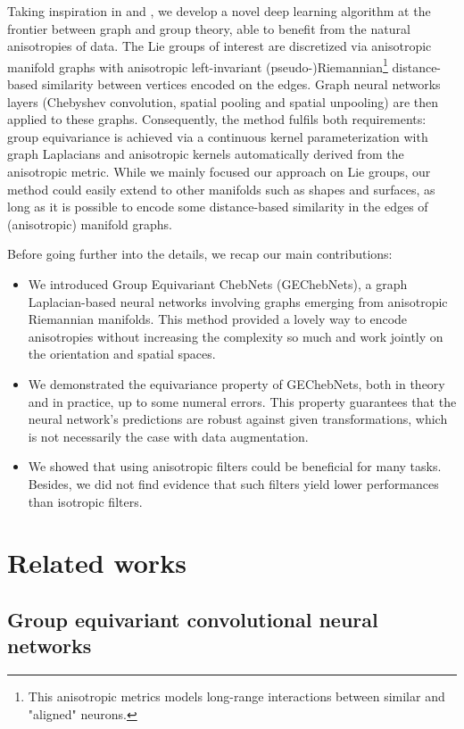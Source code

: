 \documentclass{article}
\begin{document}
Taking inspiration in \citet{defferrard2020deepsphere} and \citet{bekkers2019b}, we develop a novel deep learning algorithm at the frontier between graph and group theory, able to benefit from the natural anisotropies of data. The Lie groups of interest are discretized via anisotropic manifold graphs with anisotropic left-invariant (pseudo-)Riemannian\footnote{This anisotropic metrics models long-range interactions between similar and "aligned" neurons.} distance-based similarity between vertices encoded on the edges. Graph neural networks layers (Chebyshev convolution, spatial pooling and spatial unpooling) are then applied to these graphs. Consequently, the method fulfils both requirements: group equivariance is achieved via a continuous kernel parameterization with graph Laplacians and anisotropic kernels automatically derived from the anisotropic metric. While we mainly focused our approach on Lie groups, our method could easily extend to other manifolds such as shapes and surfaces, as long as it is possible to encode some distance-based similarity in the edges of (anisotropic) manifold graphs.

Before going further into the details, we recap our main contributions:
\begin{itemize}
\item We introduced Group Equivariant ChebNets (GEChebNets), a graph Laplacian-based neural networks involving graphs emerging from anisotropic Riemannian manifolds. This method provided a lovely way to encode anisotropies without increasing the complexity so much and work jointly on the orientation and spatial spaces.
\item We demonstrated the equivariance property of GEChebNets, both in theory and in practice, up to some numeral errors. This property guarantees that the neural network's predictions are robust against given transformations, which is not necessarily the case with data augmentation.
\item We showed that using anisotropic filters could be beneficial for many tasks. Besides, we did not find evidence that such filters yield lower performances than isotropic filters.
\end{itemize}

\section{Related works} \label{sec:related_works}

\subsection{Group equivariant convolutional neural networks} \label{group_equivaiant_convolutional_neural_networks}
\end{document}

